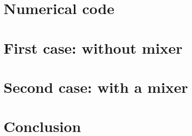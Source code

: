 \documentclass[a4paper,10pt]{scrartcl}
\begin{document}
\section{Numerical code}
\section{First case: without mixer}
\section{Second case: with a mixer}
\section{Conclusion}
\end{document}
